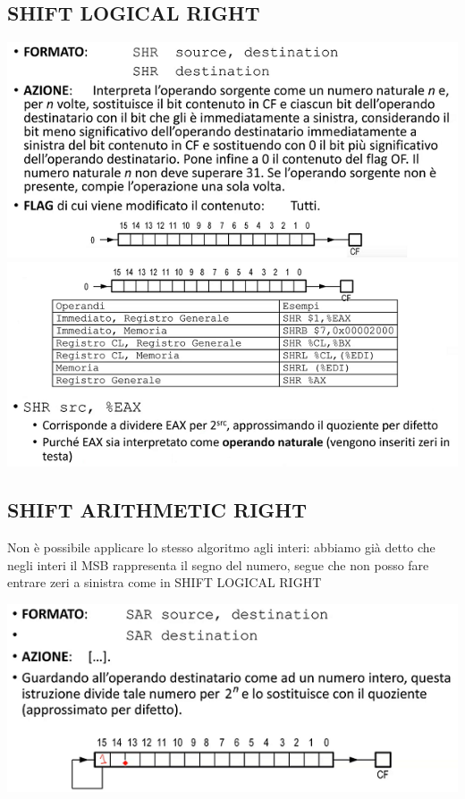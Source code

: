\documentclass[11pt]{report}
\begin{document}
\subsection{SHIFT LOGICAL RIGHT}
\begin{center}
\includegraphics{img/27.PNG}
\includegraphics{img/28.PNG}
\end{center}

\subsection{SHIFT ARITHMETIC RIGHT}
Non è possibile applicare lo stesso algoritmo agli interi: abbiamo già detto che negli interi il MSB rappresenta il segno del numero, segue che non posso fare entrare zeri a sinistra come in SHIFT LOGICAL RIGHT
\begin{center}
\includegraphics{img/29.PNG}
\end{center}
\end{document}
